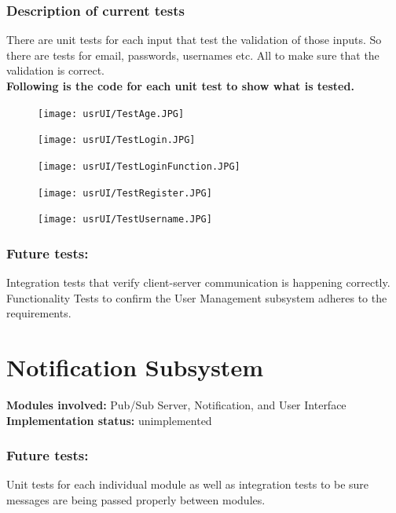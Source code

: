 \documentclass[12pt]{article}
\begin{document}
{	\subsubsection{Description of current tests}
	There are unit tests for each input that test the validation of those inputs. So there are tests for email, passwords, usernames etc. All to make sure that the validation is correct. \\
	\textbf{Following is the code for each unit test to show what is tested.}
	\begin{center}
	\begin{figure}[h]
		\texttt{[image: usrUI/TestAge.JPG]}
	\end{figure}

	\begin{figure}[h]
		\texttt{[image: usrUI/TestLogin.JPG]}
	\end{figure}

	\begin{figure}[h]
		\texttt{[image: usrUI/TestLoginFunction.JPG]}
	\end{figure}

	\begin{figure}[h]
		\texttt{[image: usrUI/TestRegister.JPG]}
	\end{figure}

	\begin{figure}[h]
		\texttt{[image: usrUI/TestUsername.JPG]}
	\end{figure}
	\end{center}

	\subsubsection{Future tests:}
	Integration tests that verify client-server communication is happening correctly. Functionality Tests to confirm the User Management subsystem adheres to the requirements. 

	\section{Notification Subsystem }
	\textbf{Modules involved:} Pub/Sub Server, Notification, and User Interface \\
	\textbf{Implementation status:} unimplemented \\
	\subsubsection{Future tests:}
	Unit tests for each individual module as well as integration tests to be sure messages are being passed properly between modules. 

}
\end{document}
